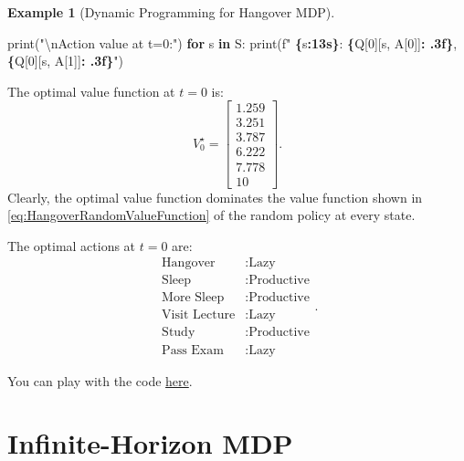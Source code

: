 \documentclass[
]{book}
\newenvironment{Shaded}{\begin{snugshade}}{\end{snugshade}}
\newcommand{\BuiltInTok}[1]{#1}
\newcommand{\CharTok}[1]{\textcolor[rgb]{0.31,0.60,0.02}{#1}}
\newcommand{\ControlFlowTok}[1]{\textcolor[rgb]{0.13,0.29,0.53}{\textbf{#1}}}
\newcommand{\DecValTok}[1]{\textcolor[rgb]{0.00,0.00,0.81}{#1}}
\newcommand{\KeywordTok}[1]{\textcolor[rgb]{0.13,0.29,0.53}{\textbf{#1}}}
\newcommand{\NormalTok}[1]{#1}
\newcommand{\SpecialCharTok}[1]{\textcolor[rgb]{0.81,0.36,0.00}{\textbf{#1}}}
\newcommand{\SpecialStringTok}[1]{\textcolor[rgb]{0.31,0.60,0.02}{#1}}
\newcommand{\StringTok}[1]{\textcolor[rgb]{0.31,0.60,0.02}{#1}}
\theoremstyle{definition}
\theoremstyle{definition}
\newtheorem{example}{Example}[chapter]
\theoremstyle{definition}
\theoremstyle{definition}
\theoremstyle{remark}
\begin{document}
\begin{example}[Dynamic Programming for Hangover MDP]
\begin{Shaded}
\begin{Highlighting}[]
    \BuiltInTok{print}\NormalTok{(}\StringTok{"}\CharTok{\textbackslash{}n}\StringTok{Action value at t=0:"}\NormalTok{)}
    \ControlFlowTok{for}\NormalTok{ s }\KeywordTok{in}\NormalTok{ S:}
        \BuiltInTok{print}\NormalTok{(}\SpecialStringTok{f"  }\SpecialCharTok{\{}\NormalTok{s}\SpecialCharTok{:13s\}}\SpecialStringTok{: }\SpecialCharTok{\{}\NormalTok{Q[}\DecValTok{0}\NormalTok{][s, A[}\DecValTok{0}\NormalTok{]]}\SpecialCharTok{: .3f\}}\SpecialStringTok{, }\SpecialCharTok{\{}\NormalTok{Q[}\DecValTok{0}\NormalTok{][s, A[}\DecValTok{1}\NormalTok{]]}\SpecialCharTok{: .3f\}}\SpecialStringTok{"}\NormalTok{)}
\end{Highlighting}
\end{Shaded}

The optimal value function at \(t=0\) is:
\begin{equation}
V^\star_0 = \begin{bmatrix}
1.259 \\
3.251 \\
3.787 \\
6.222 \\
7.778 \\
10
\end{bmatrix}.
\label{eq:HangoverOptimalValueFunction}
\end{equation}
Clearly, the optimal value function dominates the value function shown in \eqref{eq:HangoverRandomValueFunction} of the random policy at every state.

The optimal actions at \(t=0\) are:
\begin{equation}
\begin{split}
\text{Hangover} & : \text{Lazy} \\
\text{Sleep}        & : \text{Productive} \\
\text{More Sleep}   & : \text{Productive} \\
\text{Visit Lecture} & : \text{Lazy} \\
\text{Study}      & : \text{Productive} \\
\text{Pass Exam}    & : \text{Lazy}
\end{split}.
\end{equation}

You can play with the code \href{https://github.com/ComputationalRobotics/2025-ES-AM-158-LECTURE-CODE/blob/main/hangover_dynamic_programming.py}{here}.
\end{example}

\section{Infinite-Horizon MDP}\label{InfiniteHorizonMDP}
\end{document}
